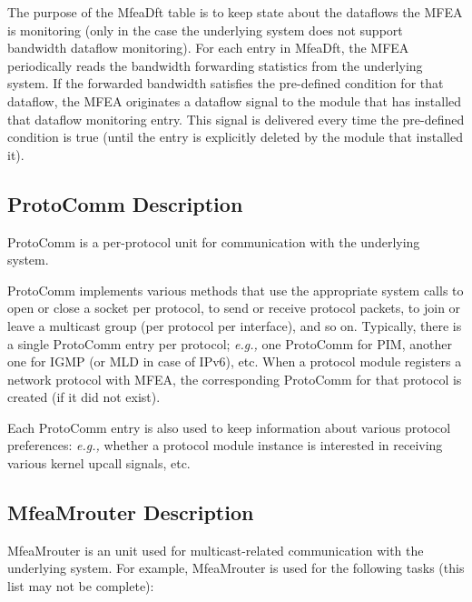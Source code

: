 \documentclass[11pt]{article}
\newcommand{\eg}{\emph{e.g.,}\xspace}
\begin{document}
The purpose of the MfeaDft table is to keep state about the dataflows the
MFEA is monitoring (only in the case the underlying
system does not support bandwidth dataflow monitoring). For each entry
in MfeaDft, the MFEA periodically reads the bandwidth forwarding
statistics from the underlying system. If the forwarded bandwidth
satisfies the pre-defined condition for that dataflow, the MFEA
originates a dataflow signal to the module that has installed that
dataflow monitoring entry. This signal is delivered every time the
pre-defined condition is true (until the entry is explicitly deleted by
the module that installed it).

\subsection{ProtoComm Description}

ProtoComm is a per-protocol unit for communication with the
underlying system.

ProtoComm implements various methods that use the appropriate system
calls to open or close a socket per protocol, to send or receive
protocol packets, to join or leave a multicast group (per protocol per
interface), and so on. Typically, there is a single ProtoComm entry per
protocol; \eg one ProtoComm for PIM, another one for IGMP (or MLD in
case of IPv6), etc. When a protocol module registers a network protocol
with MFEA, the corresponding ProtoComm for that protocol is created (if
it did not exist).

Each ProtoComm entry is also used to keep information about various
protocol preferences: \eg whether a protocol module instance is interested in
receiving various kernel upcall signals, etc.

\subsection{MfeaMrouter Description}

MfeaMrouter is an unit used for multicast-related communication with the
underlying system. For example, MfeaMrouter is used for the following
tasks (this list may not be complete):
\end{document}
